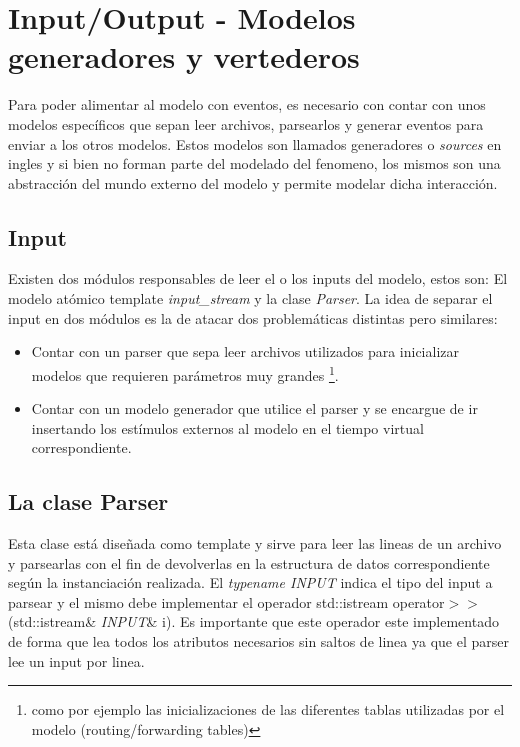 \documentclass[10pt,a4paper]{article}
\begin{document}
\section{Input/Output - Modelos generadores y vertederos} \label{section: I/O}
Para poder alimentar al modelo con eventos, es necesario con contar con unos modelos específicos que sepan leer archivos, parsearlos y generar eventos para enviar a los otros modelos. Estos modelos son llamados generadores o \textit{sources} en ingles y si bien no forman parte del modelado del fenomeno, los mismos son una abstracción del mundo externo del modelo y permite modelar dicha interacción.

\subsection{Input}
Existen dos módulos responsables de leer el o los inputs del modelo, estos son: El modelo atómico template \textit{input\_stream} y la clase \textit{Parser}. La idea de separar el input en dos módulos es la de atacar dos problemáticas distintas pero similares:

\begin{itemize}
\item Contar con un parser que sepa leer archivos utilizados para inicializar modelos que requieren parámetros muy grandes \footnote{como por ejemplo las inicializaciones de las diferentes tablas utilizadas por el modelo (routing/forwarding tables)}.
\item Contar con un modelo generador que utilice el parser y se encargue de ir insertando los estímulos externos al modelo en el tiempo virtual correspondiente.\\
\end{itemize}

\subsection{La clase Parser}
Esta clase está diseñada como template y sirve para leer las lineas de un archivo y parsearlas con el fin de devolverlas en la estructura de datos correspondiente según la instanciación realizada. El \textit{typename INPUT} indica el tipo del input a parsear y el mismo debe implementar el operador std::istream \textsf{operator}$>>$(\textsf{std::istream}\& \textit{INPUT}\& i). Es importante que este operador este implementado de forma que lea todos los atributos necesarios sin saltos de linea ya que el parser lee un input por linea.\\
\end{document}
